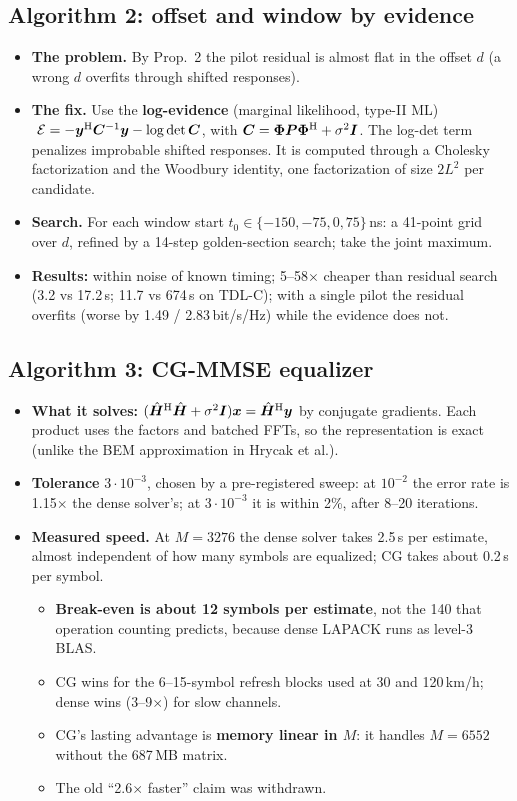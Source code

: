 \documentclass[11pt,a4paper]{article}
\begin{document}
\subsection{Algorithm 2: offset and window by evidence}
\begin{itemize}
\item \textbf{The problem.} By Prop.~2 the pilot residual is almost flat in the offset $d$ (a wrong $d$ overfits through
shifted responses).
\item \textbf{The fix.} Use the \textbf{log-evidence} (marginal likelihood, type-II ML)
$\ \mathcal E = -\bm y^{\rm H}\bm C^{-1}\bm y - \log\det\bm C$, with $\bm C=\bm\Phi\bm P\bm\Phi^{\rm H}+\sigma^2\bm I$.
The log-det term penalizes improbable shifted responses. It is computed through a Cholesky factorization and the
Woodbury identity, one factorization of size $2L^2$ per candidate.
\item \textbf{Search.} For each window start $t_0\in\{-150,-75,0,75\}$\,ns: a 41-point grid over $d$, refined by a 14-step
golden-section search; take the joint maximum.
\item \textbf{Results:} within noise of known timing; 5--58$\times$ cheaper than residual search (3.2 vs 17.2\,s; 11.7 vs
674\,s on TDL-C); with a single pilot the residual overfits (worse by 1.49 / 2.83\,bit/s/Hz) while the evidence does not.
\end{itemize}

\subsection{Algorithm 3: CG-MMSE equalizer}
\begin{itemize}
\item \textbf{What it solves:} $(\hat{\bm H}^{\rm H}\hat{\bm H}+\sigma^2\bm I)\bm x=\hat{\bm H}^{\rm H}\bm y$ by conjugate
gradients. Each product uses the factors and batched FFTs, so the representation is exact (unlike the BEM approximation in
Hrycak et al.).
\item \textbf{Tolerance} $3\cdot10^{-3}$, chosen by a pre-registered sweep: at $10^{-2}$ the error rate is 1.15$\times$ the
dense solver's; at $3\cdot10^{-3}$ it is within 2\%, after 8--20 iterations.
\item \textbf{Measured speed.} At $M=3276$ the dense solver takes 2.5\,s per estimate, almost independent of how many
symbols are equalized; CG takes about 0.2\,s per symbol.
  \begin{itemize}
  \item \textbf{Break-even is about 12 symbols per estimate}, not the 140 that operation counting predicts, because dense
  LAPACK runs as level-3 BLAS.
  \item CG wins for the 6--15-symbol refresh blocks used at 30 and 120\,km/h; dense wins (3--9$\times$) for slow channels.
  \item CG's lasting advantage is \textbf{memory linear in $M$}: it handles $M=6552$ without the 687\,MB matrix.
  \item The old ``2.6$\times$ faster'' claim was withdrawn.
  \end{itemize}
\end{itemize}
\end{document}
